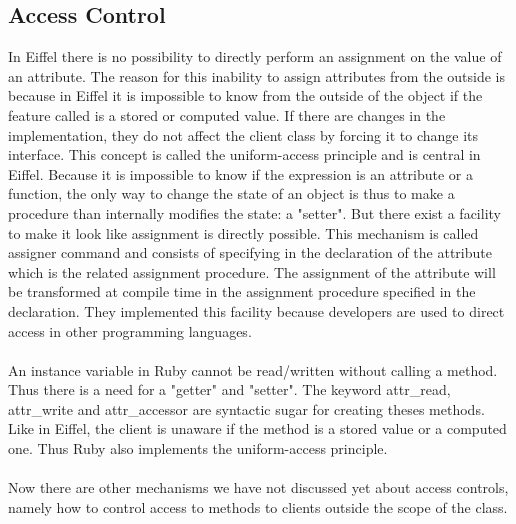 \documentclass[12pt,a4paper,twocolumn]{article}
\begin{document}
\subsection{Access Control}




In Eiffel there is no possibility to directly perform an assignment on the value of an attribute. The reason for this inability to assign attributes from the outside is because in Eiffel it is impossible to know from the outside of the object if the feature called is a stored or computed value. If there are changes in the implementation, they do not affect the client class by forcing it to change its interface. This concept is called the uniform-access principle and is central in Eiffel. Because it is impossible to know if the expression is an attribute or a function, the only way to change the state of an object is thus to make a procedure than internally modifies the state: a "setter". But there exist a facility to make it look like assignment is directly possible. This mechanism is called assigner command and consists of specifying in the declaration of the attribute which is the related assignment procedure. The assignment of the attribute will be transformed at compile time in the assignment procedure specified in the declaration. They implemented this facility because developers are used to direct access in other programming languages.
\\
\\
An instance variable in Ruby cannot be read/written without calling a method. Thus there is a need for a  "getter" and "setter". The keyword attr\_read, attr\_write and attr\_accessor are syntactic sugar for creating theses methods. Like in Eiffel, the client is unaware if the method is a stored value or a computed one. Thus Ruby also implements the uniform-access principle.
\\
\\
Now there are other mechanisms we have not discussed yet about access controls, namely how to control access to methods to clients outside the scope of the class.
\\
\end{document}
